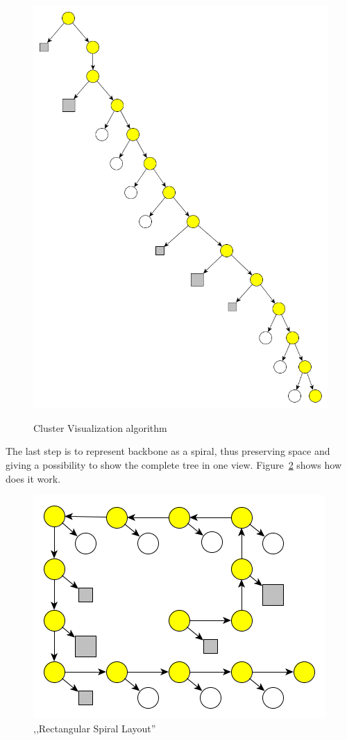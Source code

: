 \begin{figure}[h!]
{    \includegraphics[scale=0.15]{pictures/cluster_visualisation_algorithm_3.png}
    \label{fig:cluster_visualisation_algorithm_3}
}
\caption{Cluster Visualization algorithm}
\label{fig:cluster_visualisation_algorithm}
\end{figure}

The last step is to represent backbone as a spiral, thus preserving space and giving a possibility to show the complete tree in one view. Figure~\ref{fig:cluster_visualisation_algorithm_4} shows how does it work.

\begin{figure}[h!]
\centering
\includegraphics[scale=0.5]{pictures/cluster_visualisation_algorithm_4.png}
\caption{,,Rectangular Spiral Layout''}
\label{fig:cluster_visualisation_algorithm_4}
\end{figure}

